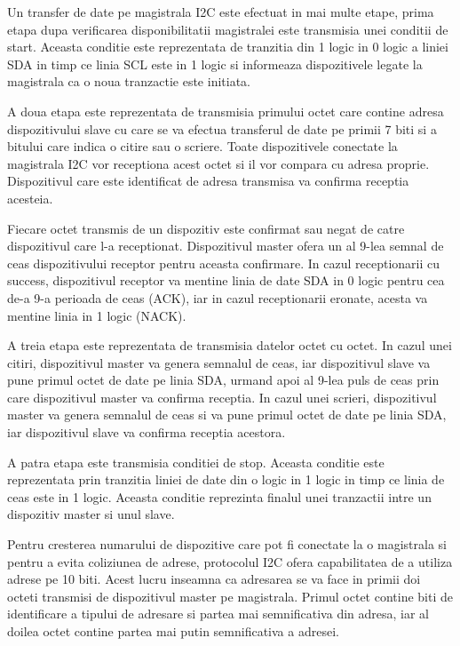 Un transfer de date pe magistrala I2C este efectuat in mai multe etape, prima etapa dupa verificarea disponibilitatii magistralei este transmisia unei conditii 
de start. Aceasta conditie este reprezentata de tranzitia din 1 logic in 0 logic a liniei SDA in timp ce linia SCL este in 1 logic si informeaza dispozitivele 
legate la magistrala ca o noua tranzactie este initiata.

A doua etapa este reprezentata de transmisia primului octet care contine adresa dispozitivului slave cu care se va efectua transferul de date pe primii 7 biti si 
a bitului care indica o citire sau o scriere. Toate dispozitivele conectate la magistrala I2C vor receptiona acest octet si il vor compara cu adresa proprie. 
Dispozitivul care este identificat de adresa transmisa va confirma receptia acesteia.

Fiecare octet transmis de un dispozitiv este confirmat sau negat de catre dispozitivul care l-a receptionat. Dispozitivul master ofera un al 9-lea semnal de ceas 
dispozitivului receptor pentru aceasta confirmare. In cazul receptionarii cu success, dispozitivul receptor va mentine linia de date SDA in 0 logic pentru cea de-a 
9-a perioada de ceas (ACK), iar in cazul receptionarii eronate, acesta va mentine linia in 1 logic (NACK).

A treia etapa este reprezentata de transmisia datelor octet cu octet. In cazul unei citiri, dispozitivul master va genera semnalul de ceas, iar dispozitivul slave 
va pune primul octet de date pe linia SDA, urmand apoi al 9-lea puls de ceas prin care dispozitivul master va confirma receptia. In cazul unei scrieri, dispozitivul 
master va genera semnalul de ceas si va pune primul octet de date pe linia SDA, iar dispozitivul slave va confirma receptia acestora.

A patra etapa este transmisia conditiei de stop. Aceasta conditie este reprezentata prin tranzitia liniei de date din o logic in 1 logic  in timp ce linia 
de ceas este in 1 logic. Aceasta conditie reprezinta finalul unei tranzactii intre un dispozitiv master si unul slave.

Pentru cresterea numarului de dispozitive care pot fi conectate la o magistrala si pentru a evita coliziunea de adrese, protocolul I2C ofera capabilitatea 
de a utiliza adrese pe 10 biti. Acest lucru inseamna ca adresarea se va face in primii doi octeti transmisi de dispozitivul master pe magistrala. Primul octet 
contine biti de identificare a tipului de adresare si partea mai semnificativa din adresa, iar al doilea octet contine partea mai putin semnificativa a adresei.

